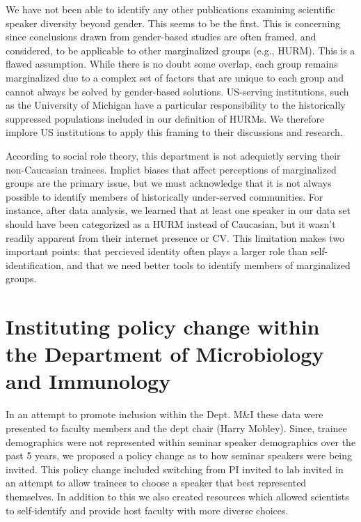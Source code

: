 \documentclass[10pt,]{article}
\begin{document}
We have not been able to identify any other publications examining
scientific speaker diversity beyond gender. This seems to be the first.
This is concerning since conclusions drawn from gender-based studies are
often framed, and considered, to be applicable to other marginalized
groups (e.g., HURM). This is a flawed assumption. While there is no
doubt some overlap, each group remains marginalized due to a complex set
of factors that are unique to each group and cannot always be solved by
gender-based solutions. US-serving institutions, such as the University
of Michigan have a particular responsibility to the historically
suppressed populations included in our definition of HURMs. We therefore
implore US institutions to apply this framing to their discussions and
research.

According to social role theory, this department is not adequietly
serving their non-Caucasian trainees. Implict biases that affect
perceptions of marginalized groups are the primary issue, but we must
acknowledge that it is not always possible to identify members of
historically under-served communities. For instance, after data
analysis, we learned that at least one speaker in our data set should
have been categorized as a HURM instead of Caucasian, but it wasn't
readily apparent from their internet presence or CV. This limitation
makes two important points: that percieved identity often plays a larger
role than self-identification, and that we need better tools to identify
members of marginalized groups.

\section{Instituting policy change within the Department of Microbiology
and
Immunology}\label{instituting-policy-change-within-the-department-of-microbiology-and-immunology}

In an attempt to promote inclusion within the Dept. M\&I these data were
presented to faculty members and the dept chair (Harry Mobley). Since,
trainee demographics were not represented within seminar speaker
demographics over the past 5 years, we proposed a policy change as to
how seminar speakers were being invited. This policy change included
switching from PI invited to lab invited in an attempt to allow trainees
to choose a speaker that best represented themselves. In addition to
this we also created resources which allowed scientists to self-identify
and provide host faculty with more diverse choices.
\end{document}
